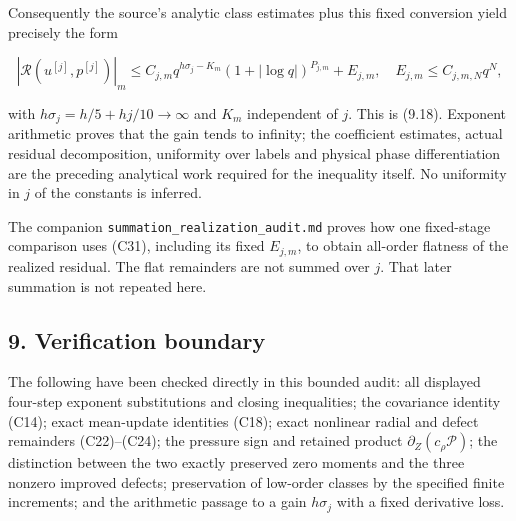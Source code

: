 \documentclass[10pt,a4paper]{article}
\begin{document}
Consequently the source's analytic class estimates plus this fixed conversion yield precisely the form

\[
|\mathcal R(u^{[j]},p^{[j]})|_m
\le C_{j,m}q^{h\sigma_j-K_m}(1+|\log q|)^{P_{j,m}}+E_{j,m},
\quad E_{j,m}\le C_{j,m,N}q^N,
\tag{C31}
\]

with \(h\sigma_j=h/5+hj/10\to\infty\) and \(K_m\) independent of \(j\). This is (9.18). Exponent arithmetic proves that the gain tends to infinity; the coefficient estimates, actual residual decomposition, uniformity over labels and physical phase differentiation are the preceding analytical work required for the inequality itself. No uniformity in \(j\) of the constants is inferred.

The companion \texttt{s\allowbreak{}u\allowbreak{}m\allowbreak{}m\allowbreak{}a\allowbreak{}t\allowbreak{}i\allowbreak{}o\allowbreak{}n\allowbreak{}\_\allowbreak{}r\allowbreak{}e\allowbreak{}a\allowbreak{}l\allowbreak{}i\allowbreak{}z\allowbreak{}a\allowbreak{}t\allowbreak{}i\allowbreak{}o\allowbreak{}n\allowbreak{}\_\allowbreak{}a\allowbreak{}u\allowbreak{}d\allowbreak{}i\allowbreak{}t\allowbreak{}.\allowbreak{}m\allowbreak{}d} proves how one fixed-stage comparison uses (C31), including its fixed \(E_{j,m}\), to obtain all-order flatness of the realized residual. The flat remainders are not summed over \(j\). That later summation is not repeated here.

\subsection{9. Verification boundary}\label{nsupstream:stage_cycle_gain_audit:verification-boundary}

The following have been checked directly in this bounded audit: all displayed four-step exponent substitutions and closing inequalities; the covariance identity (C14); exact mean-update identities (C18); exact nonlinear radial and defect remainders (C22)--(C24); the pressure sign and retained product \(\partial_Z(c_\rho\mathcal P)\); the distinction between the two exactly preserved zero moments and the three nonzero improved defects; preservation of low-order classes by the specified finite increments; and the arithmetic passage to a gain \(h\sigma_j\) with a fixed derivative loss.
\end{document}
